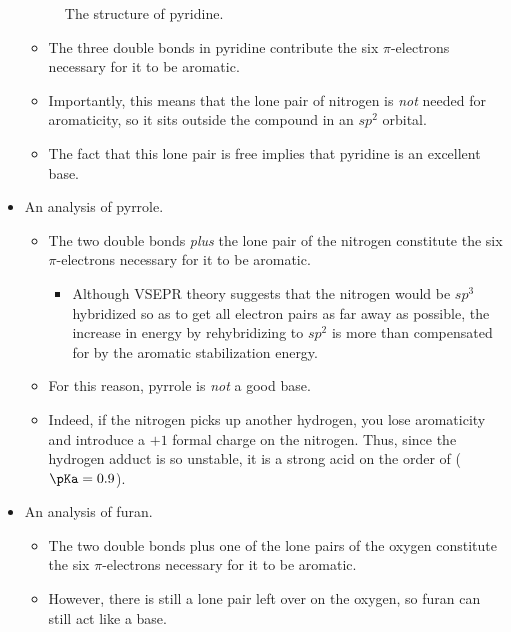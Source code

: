 \documentclass[../notes.tex]{subfiles}
\begin{document}
\begin{itemize}
\begin{figure}[h!]
        \caption{The structure of pyridine.}
        \label{fig:pyridineStructure}
    \end{figure}
    \begin{itemize}
        \item The three double bonds in pyridine contribute the six $\pi$-electrons necessary for it to be aromatic.
        \item Importantly, this means that the lone pair of nitrogen is \emph{not} needed for aromaticity, so it sits outside the compound in an $sp^2$ orbital.
        \item The fact that this lone pair is free implies that pyridine is an excellent base.
    \end{itemize}
    \item An analysis of pyrrole.
    \begin{itemize}
        \item The two double bonds \emph{plus} the lone pair of the nitrogen constitute the six $\pi$-electrons necessary for it to be aromatic.
        \begin{itemize}
            \item Although VSEPR theory suggests that the nitrogen would be $sp^3$ hybridized so as to get all electron pairs as far away as possible, the increase in energy by rehybridizing to $sp^2$ is more than compensated for by the aromatic stabilization energy.
        \end{itemize}
        \item For this reason, pyrrole is \emph{not} a good base.
        \item Indeed, if the nitrogen picks up another hydrogen, you lose aromaticity and introduce a $+1$ formal charge on the nitrogen. Thus, since the hydrogen adduct is so unstable, it is a strong acid on the order of  ($\pKa=0.9$).
    \end{itemize}
    \item An analysis of furan.
    \begin{itemize}
        \item The two double bonds plus one of the lone pairs of the oxygen constitute the six $\pi$-electrons necessary for it to be aromatic.
        \item However, there is still a lone pair left over on the oxygen, so furan can still act like a base.

\end{itemize}
\end{itemize}
\end{document}
